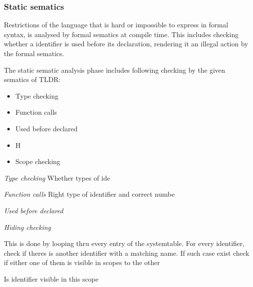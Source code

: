 \subsubsection{Static sematics}

Restrictions of the language that is hard or impossible to express in formal syntax, is analysed by formal sematics at compile time. This includes checking whether a identifier is used before its declaration, rendering it an illegal action by the formal sematics. 

The static sematic analysis phase includes following checking by the given sematics of TLDR:
\begin{itemize}
\item Type checking 
\item Function calls
\item Used before declared
\item H%
\item Scope checking
\end{itemize}

\emph{Type checking}
  Whether types of ide%
  
\emph{Function calls}
  Right type of identifier and correct numbe%

\emph{Used before declared}
  
  
  
\emph{Hiding checking}
  
  This is done by looping thru every entry of the systemtable. For every identifier, check if theres is another identifier with a matching name. If such case exist check if either one of them is visible in scopes to the other

  Is identifier visible in this scope
